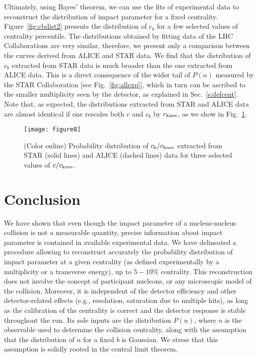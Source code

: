 \documentclass[aps,prc,twocolumn,superscriptaddress,showpacs,floatfix,nofootinbib]{revtex4-1}
\begin{document}
Ultimately, using Bayes' theorem, we can use the fits of experimental data to reconstruct the distribution of impact parameter for a fixed centrality. 
Figure~\ref{fig:cbdist2} presents the distribution of $c_b$ for a few selected values of centrality percentile. 
The distributions obtained by fitting data of the LHC Collaborations are very similar, therefore, we present only a comparison between the curves derived from ALICE and STAR data.
We find that the distribution of $c_b$ extracted from STAR data is much broader than the one extracted from ALICE data. 
This is a direct consequence of the wider tail of $P(n)$ measured by the STAR Collaboration [see Fig.~\ref{fig:allexp}], which in turn can be ascribed to the smaller multiplicity seen by the detector, as explained in Sec.~\ref{s:defcent}. 
Note that, as expected, the distributions extracted from STAR and ALICE data are almost identical if one rescales both $c$ and $c_b$ by $c_{\rm knee}$, as we show in Fig.~\ref{fig:cbknee}.

\begin{figure}[t!]
\begin{center}
\texttt{[image: figure8]}
\end{center}
\caption{(Color online)
Probability distribution of $c_b/c_{\rm knee}$ extracted from STAR (solid lines) and ALICE (dashed lines) data for three selected
values of $c/c_{\rm knee}$.  
\label{fig:cbknee}
}
\end{figure}

\section{Conclusion}
We have shown that even though the impact parameter of a nucleus-nucleus collision is not a measurable quantity, precise information about impact parameter is contained in available experimental data. 
We have delineated a procedure allowing to reconstruct accurately the probability distribution of impact parameter at a given centrality (as defined experimentally by a multiplicity or a transverse energy), up to $5-10\%$ centrality.  
This reconstruction does not involve the concept of participant nucleons, or any microscopic model of the collision.
Moreover, it is independent of the detector efficiency and other detector-related effects (e.g., resolution, saturation due to multiple hits), as long as the calibration of the centrality is correct and the detector response is stable throughout the run.
Its sole inputs are the distribution $P(n)$, where $n$ is the observable used to determine the collision centrality, along with the assumption that the distribution of $n$ for a fixed $b$ is Gaussian.
We stress that this assumption is solidly rooted in the central limit theorem.
\end{document}
